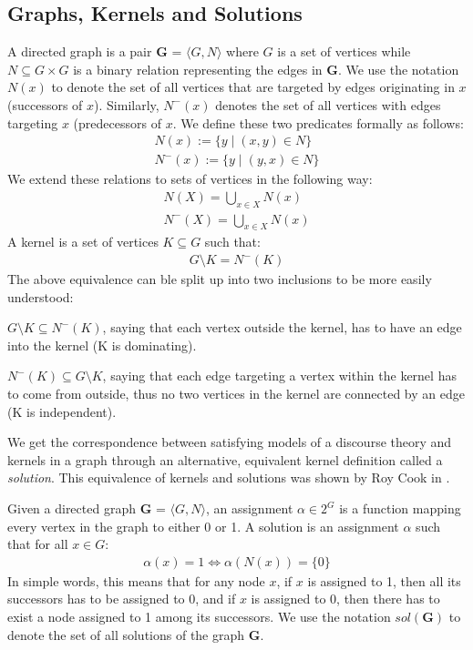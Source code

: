 \subsection{Graphs, Kernels and Solutions}
\label{sub:Graphs, Kernels and Solution}
A directed graph is a pair \textbf{G} = $\langle G,N \rangle$ where $G$ is a set of vertices while $N \subseteq G \times G$ is a binary relation representing the edges in \textbf{G}.
We use the notation $N(x)$ to denote the set of all vertices that are targeted by edges originating in $x$ (successors of $x$).
Similarly, $N^-(x)$ denotes the set of all vertices with edges targeting $x$ (predecessors of $x$.
We define these two predicates formally as follows:
\begin{align}
  N(x) := \{y \;|\; (x,y) \in N\}\\
  N^-(x) := \{ y \;|\; (y,x) \in N \}
\end{align}
We extend these relations to sets of vertices in the following way:
\begin{align}
  N(X) = \bigcup_{x \in X} N(x)\\
  N^-(X) = \bigcup_{x \in X} N(x)
\end{align}
A kernel is a set of vertices $K \subseteq G$ such that:
\begin{align}
  G \setminus K = N^-(K)
\end{align}
The above equivalence can ble split up into two inclusions to be more easily understood:

$G \setminus K \subseteq N^-(K)$, saying that each vertex outside the kernel, has to have an edge into the kernel (K is dominating).

$N^-(K) \subseteq G \setminus K$, saying that each edge targeting a vertex within the kernel has to come from outside, thus no two vertices in the kernel are connected by an edge (K is independent).

We get the correspondence between satisfying models of a discourse theory and kernels in a graph through an alternative, equivalent kernel definition called a \textit{solution}.
This equivalence of kernels and solutions was shown by Roy Cook in \cite{}.

Given a directed graph \textbf{G} = $\langle G,N \rangle$, an assignment $\alpha \in 2^G$ is a function mapping every vertex in the graph to either 0 or 1.
A solution is an assignment $\alpha$ such that for all $x \in G:$
\begin{align}
  \alpha(x) = 1 \iff \alpha(N(x)) = \{ 0 \}
\end{align}
In simple words, this means that for any node $x$, if $x$ is assigned to 1, then all its successors has to be assigned to 0, and if $x$ is assigned to 0, then there has to exist a node assigned to 1 among its successors.
We use the notation $sol(\mathbf{G})$ to denote the set of all solutions of the graph \textbf{G}.
